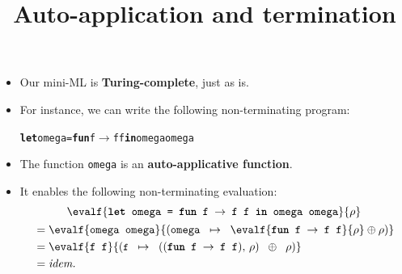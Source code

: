 \documentclass[wide]{slides}
\begin{document}
\begin{slide}
  \title{Auto-application and termination}

  \begin{itemize}

    \item Our mini-ML is \textbf{Turing\hyp{}complete}, just as \OCaml
      is.

    \item For instance, we can write the following
      non\hyp{}terminating program:
      \smallskip
\begin{alltt}
\textbf{let} omega = \textbf{fun} f \(\rightarrow\) f f \textbf{in} omega omega
\end{alltt}

    \item The function \texttt{omega} is an
      \textbf{auto\hyp{}applicative function}.

    \item It enables the following non\hyp{}terminating evaluation:
      \smallskip
      \begin{gather*}
        \evalf{\texttt{\textbf{let} omega = \textbf{fun} f \(\rightarrow\) f f \textbf{in} omega omega}}{\rho}\\
\begin{align*}
&= \evalf{\texttt{omega omega}}{(\texttt{omega} \;\; \mapsto \;\;
    \evalf{\texttt{\textbf{fun} f \(\rightarrow\) f f}}{\rho} \oplus
    \rho)}\\ &= \evalf{\texttt{f f}}{(\texttt{\small f} \;\; \mapsto
    \;\; ((\texttt{\textbf{fun} f \(\rightarrow\) f f}), \, \rho)
    \;\; \oplus \;\; \rho)}\\ &= \text{\emph{idem.}}
\end{align*}
\end{gather*}

  \end{itemize}

\end{slide}
\end{document}
